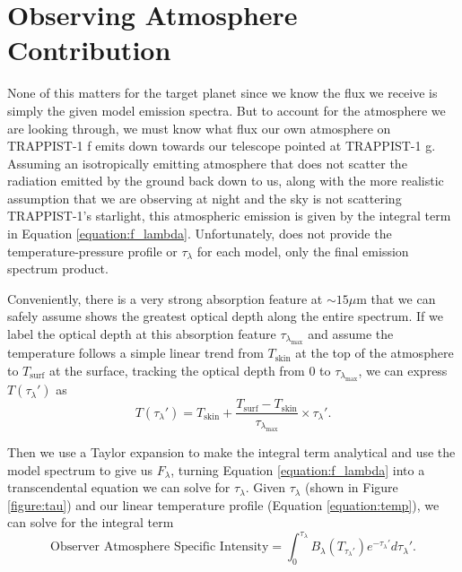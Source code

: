 \documentclass{knac}
\begin{document}
\section{Observing Atmosphere Contribution}
None of this matters for the target planet since we know the flux we receive is simply the given model emission spectra. But to account for the atmosphere we are looking through, we must know what flux our own atmosphere on TRAPPIST-1 f emits down towards our telescope pointed at TRAPPIST-1 g. Assuming an isotropically emitting atmosphere that does not scatter the radiation emitted by the ground back down to us, along with the more realistic assumption that we are observing at night and the sky is not scattering TRAPPIST-1's starlight, this atmospheric emission is given by the integral term in Equation \ref{equation:f_lambda}. Unfortunately, \cite{Morley2017} does not provide the temperature-pressure profile or $\tau_\lambda$ for each model, only the final emission spectrum product.

Conveniently, there is a very strong absorption feature at $\sim15 \mu$m that we can safely assume shows the greatest optical depth along the entire spectrum. If we label the optical depth at this absorption feature $\tau_{\lambda_{\mathrm{max}}}$ and assume the temperature follows a simple linear trend from $T_{\mathrm{skin}}$ at the top of the atmosphere to $T_{\mathrm{surf}}$ at the surface, tracking the optical depth from $0$ to $\tau_{\lambda_{\mathrm{max}}}$, we can express $T(\tau_{\lambda}')$ as
\begin{equation}
\label{equation:temp}
T(\tau_{\lambda}') = T_{\mathrm{skin}} + \frac{T_{\mathrm{surf}} - T_{\mathrm{skin}}}{\tau_{\lambda_{\mathrm{max}}}}\times \tau_{\lambda}'.
\end{equation}

Then we use a Taylor expansion to make the integral term analytical and use the model spectrum to give us $F_\lambda$, turning Equation \ref{equation:f_lambda} into a transcendental equation we can solve for $\tau_\lambda$. Given $\tau_\lambda$ (shown in Figure \ref{figure:tau}) and our linear temperature profile (Equation \ref{equation:temp}), we can solve for the integral term
\begin{equation}
    \text{Observer Atmosphere Specific Intensity} = \int_{0}^{\tau_\lambda} B_\lambda (T_{\tau_{\lambda}'})e^{-\tau_{\lambda}'}d\tau_{\lambda}'.
    \label{equation:background_integral}
\end{equation}
\end{document}
